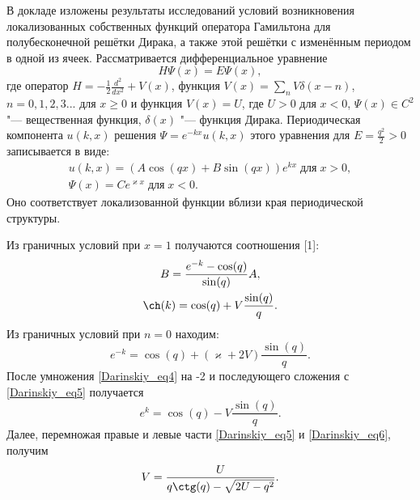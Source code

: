 \vzmscaption

В докладе изложены результаты исследований условий возникновения локализованных собственных функций оператора Гамильтона
для полубесконечной решётки Дирака, а также этой решётки с изменённым периодом в одной из ячеек. Рассматривается дифференциальное уравнение
\begin{equation} \label{Darinskiy_eq1}
 H\Psi(x)=E\Psi(x),
\end{equation}
где оператор $H=-\frac{1}{2}\frac{d^2}{dx^2}+V(x)$, функция $V(x)=\sum\limits_nV\delta(x-n)$, $n=0,1,2,3...$ для $x\geq0$ и
функция $V(x)=U$, где $U>0$ для $x<0$, $\Psi(x)\in C^2$ "--- вещественная функция,
$\delta(x)$ "--- функция Дирака. Периодическая компонента $u(k,x)$ решения $\Psi=e^{-kx}u(k,x)$ этого уравнения  для $E=\frac{q^2}{2}>0$ записывается в виде:
\begin{equation} \label{Darinskiy_eq2}
\begin{array}{c}
u(k,x)=(A\cos(qx)+B\sin(qx))e^{kx}\;\text{для}\;x>0,\\
\Psi(x)=Ce^{\varkappa x}\;\text{для}\;x<0.
\end{array}
\end{equation}
Оно соответствует локализованной функции вблизи края периодической структуры.
\par Из граничных условий при $x=1$ получаются соотношения [1]:
\begin{gather}
B=\frac{e^{-k}-\cos(q)}{\sin(q)}A,\\
\ch(k)=\cos(q)+V\frac{\sin(q)}{q}. \label{Darinskiy_eq4}
\end{gather}
Из граничных условий при $n=0$ находим:
\begin{equation}\label{Darinskiy_eq5}
e^{-k}=\cos(q)+\left(\varkappa+2V\right)\frac{\sin(q)}{q}.
\end{equation}
После умножения \eqref{Darinskiy_eq4} на -2 и последующего сложения с \eqref{Darinskiy_eq5} получается
\begin{equation} \label{Darinskiy_eq6}
 e^{k}=\cos(q)-V\frac{\sin(q)}{q}.
\end{equation}
Далее, перемножая правые и левые части \eqref{Darinskiy_eq5} и \eqref{Darinskiy_eq6}, получим
\begin{equation} \label{Darinskiy_eq7}
V=\frac{U}{q\ctg(q)-\sqrt{2U-q^2}}.
\end{equation}

